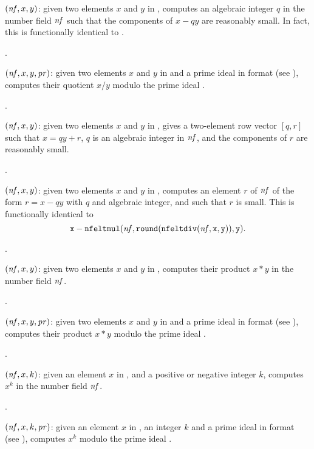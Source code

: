 $(\hbox{\it nf\/},x,y)$: given two elements $x$ and $y$ in
, computes an algebraic integer $q$ in the number field $\hbox{\it nf\/}$
such that the components of $x-qy$ are reasonably small. In fact, this is
functionally identical to .

.

$(\hbox{\it nf\/},x,y,\hbox{\it pr\/})$: given two elements $x$
and $y$ in  and  a prime ideal in  format (see
), computes their quotient $x / y$ modulo the prime ideal
.

.

$(\hbox{\it nf\/},x,y)$: given two elements $x$ and $y$ in
, gives a two-element row vector $[q,r]$ such that $x=qy+r$, $q$ is
an algebraic integer in $\hbox{\it nf\/}$, and the components of $r$ are
reasonably small.

.

$(\hbox{\it nf\/},x,y)$: given two elements $x$ and $y$ in
, computes an element $r$ of $\hbox{\it nf\/}$ of the form $r=x-qy$ with
$q$ and algebraic integer, and such that $r$ is small. This is functionally
identical to
$${\tt x - nfeltmul(\hbox{\it nf\/},round(nfeltdiv(\hbox{\it nf\/},x,y)),y)}.$$

.

$(\hbox{\it nf\/},x,y)$: given two elements $x$ and $y$ in
, computes their product $x*y$ in the number field $\hbox{\it nf\/}$.

.

$(\hbox{\it nf\/},x,y,\hbox{\it pr\/})$: given two elements $x$ and
$y$ in  and  a prime ideal in  format (see
), computes their product $x*y$ modulo the prime ideal
.

.

$(\hbox{\it nf\/},x,k)$: given an element $x$ in ,
and a positive or negative integer $k$, computes $x^k$ in the number field
$\hbox{\it nf\/}$.

.

$(\hbox{\it nf\/},x,k,\hbox{\it pr\/})$: given an element $x$ in
, an integer $k$ and a prime ideal  in  format
(see ), computes $x^k$ modulo the prime ideal .

